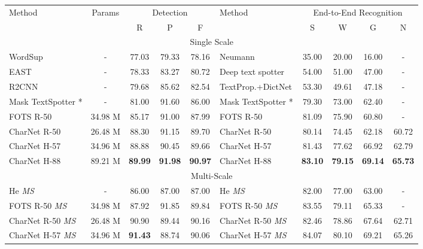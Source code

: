 \documentclass[10pt,twocolumn,letterpaper]{article}
\begin{document}
\begin{table*}[!t]
    \centering
\begin{tabular}{l|c|c|c|c|l|c|c|c|c}
	    \hline
		\multirow{2}{*}{Method} & \multirow{2}{*}{Params} & \multicolumn{3}{c|}{Detection} & \multirow{2}{*}{Method} & \multicolumn{4}{c}{End-to-End Recognition} \\
		\cline{3-5} \cline{7-10} & & R & P & F & & S & W & G & N \\
		\hline
		\multicolumn{10}{c}{Single Scale}\\
 		\hline
 		WordSup \cite{hu2017wordsup} & - & 77.03 & 79.33 & 78.16 & Neumann \etal \cite{neumann2016real} & 35.00 & 20.00 & 16.00 & - \\
  		EAST \cite{zhou2017east} & - & 78.33 & 83.27 & 80.72 & Deep text spotter \cite{busta2017deep} & 54.00 & 51.00 & 47.00 & - \\
		R2CNN \cite{jiang2017r2cnn} & - & 79.68 & 85.62 & 82.54 & TextProp.+DictNet \cite{hochreiter1997long, zhang2015symmetry} & 53.30 & 49.61 & 47.18 & - \\
		Mask TextSpotter \cite{lyu2018mask} * & - & 81.00 & 91.60 & 86.00 & Mask TextSpotter \cite{lyu2018mask} * & 79.30 & 73.00 & 62.40 & - \\
		FOTS R-50 \cite{liu2018fots} & 34.98 M & 85.17 & 91.00 & 87.99 & FOTS R-50 \cite{liu2018fots} & 81.09 & 75.90 & 60.80 & - \\
        \hline
		CharNet R-50 & 26.48 M & 88.30 & 91.15 & 89.70 & CharNet R-50 & 80.14 & 74.45 & 62.18 & 60.72 \\
		CharNet H-57 & 34.96 M & 88.88 & 90.45 & 89.66 & CharNet H-57 & 81.43 & 77.62 & 66.92 & 62.79 \\
		CharNet H-88 & 89.21 M & \textbf{89.99} & \textbf{91.98} & \textbf{90.97} & CharNet H-88 & \textbf{83.10} & \textbf{79.15} & \textbf{69.14} & \textbf{65.73} \\
		\hline \multicolumn{10}{c}{Multi-Scale} \\ \hline
		He \etal \textit{MS} \cite{he2018end} & - & 86.00 & 87.00 & 87.00 & He \etal \textit{MS} \cite{he2018end} & 82.00 & 77.00 & 63.00 & - \\
		FOTS R-50 \textit{MS} \cite{liu2018fots} & 34.98 M & 87.92 & 91.85 & 89.84 & FOTS R-50 \textit{MS} \cite{liu2018fots} & 83.55 & 79.11 & 65.33 & - \\
		\hline
		CharNet R-50 \textit{MS} & 26.48 M & 90.90 & 89.44 & 90.16 & CharNet R-50 \textit{MS} & 82.46 & 78.86 & 67.64 & 62.71 \\
		CharNet H-57 \textit{MS} & 34.96 M & \textbf{91.43} & 88.74 & 90.06 & CharNet H-57  \textit{MS} & 84.07 & 80.10 & 69.21 & 65.26 \\

\end{tabular}
\end{table*}
\end{document}

